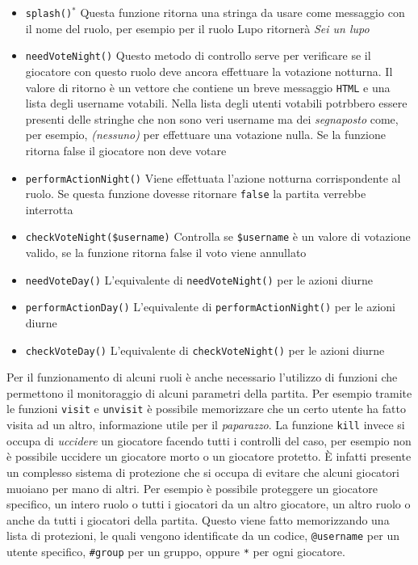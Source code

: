 \begin{itemize}[noitemsep,nolistsep]
	\item \texttt{splash()$^*$} Questa funzione ritorna una stringa da usare come messaggio con il nome del ruolo, per esempio per il ruolo Lupo ritornerà \emph{Sei un lupo}
	\item \texttt{needVoteNight()} Questo metodo di controllo serve per verificare se il giocatore con questo ruolo deve ancora effettuare la votazione notturna. Il valore di ritorno è un vettore che contiene un breve messaggio \texttt{HTML} e una lista degli username votabili. Nella lista degli utenti votabili potrbbero essere presenti delle stringhe che non sono veri username ma dei \emph{segnaposto} come, per esempio, \emph{(nessuno)} per effettuare una votazione nulla. Se la funzione ritorna false il giocatore non deve votare
	\item \texttt{performActionNight()} Viene effettuata l'azione notturna corrispondente al ruolo. Se questa funzione dovesse ritornare \texttt{false} la partita verrebbe interrotta
	\item \texttt{checkVoteNight(\$username)} Controlla se \texttt{\$username} è un valore di votazione valido, se la funzione ritorna false il voto viene annullato
	\item \texttt{needVoteDay()} L'equivalente di \texttt{needVoteNight()} per le azioni diurne
	\item \texttt{performActionDay()} L'equivalente di \texttt{performActionNight()} per le azioni diurne
	\item \texttt{checkVoteDay()} L'equivalente di \texttt{checkVoteNight()} per le azioni diurne
\end{itemize}

Per il funzionamento di alcuni ruoli è anche necessario l'utilizzo di funzioni che permettono il monitoraggio di alcuni parametri della partita. Per esempio tramite le funzioni \texttt{visit} e \texttt{unvisit} è possibile memorizzare che un certo utente ha fatto visita ad un altro, informazione utile per il \emph{paparazzo}. La funzione \texttt{kill} invece si occupa di \emph{uccidere} un giocatore facendo tutti i controlli del caso, per esempio non è possibile uccidere un giocatore morto o un giocatore protetto. È infatti presente un complesso sistema di protezione che si occupa di evitare che alcuni giocatori muoiano per mano di altri. Per esempio è possibile proteggere un giocatore specifico, un intero ruolo o tutti i giocatori da un altro giocatore, un altro ruolo o anche da tutti i giocatori della partita. Questo viene fatto memorizzando una lista di protezioni, le quali vengono identificate da un codice, \texttt{@username} per un utente specifico, \texttt{\#group} per un gruppo, oppure \texttt{*} per ogni giocatore.

